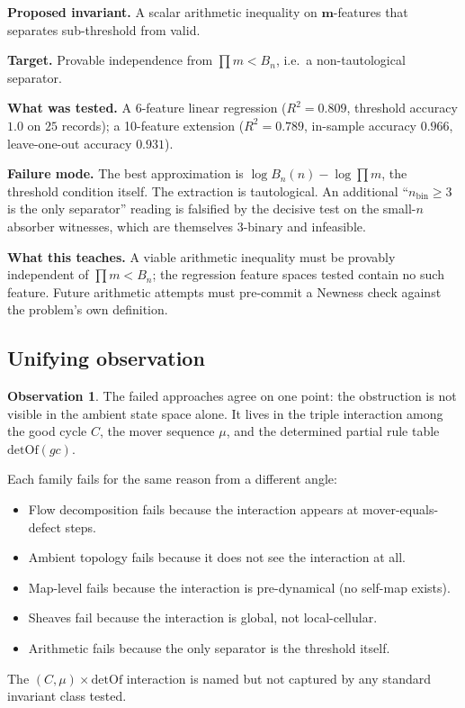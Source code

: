 \documentclass[11pt,a4paper]{article}
\theoremstyle{plain}
\theoremstyle{definition}
\newtheorem{observation}[theorem]{Observation}
\newcommand{\Bn}{B_n}
\newcommand{\detOf}{\mathrm{detOf}}
\begin{document}
\textbf{Proposed invariant.} A scalar arithmetic inequality on
$\mathbf{m}$-features that separates sub-threshold from valid.

\textbf{Target.} Provable independence from $\prod m < \Bn$, i.e.\ a
non-tautological separator.

\textbf{What was tested.} A 6-feature linear regression
($R^2 = 0.809$, threshold accuracy $1.0$ on $25$ records); a 10-feature
extension ($R^2 = 0.789$, in-sample accuracy $0.966$, leave-one-out
accuracy $0.931$).

\textbf{Failure mode.} The best approximation is
$\log \Bn(n) - \log \prod m$, the threshold condition itself.  The
extraction is tautological.  An additional ``$n_{\mathrm{bin}} \ge 3$
is the only separator'' reading is falsified by the decisive test
on the small-$n$ absorber witnesses, which are themselves $3$-binary
and infeasible.

\textbf{What this teaches.} A viable arithmetic inequality must be
provably independent of $\prod m < \Bn$; the regression feature spaces
tested contain no such feature.  Future arithmetic attempts must
pre-commit a Newness check against the problem's own definition.

\subsection{Unifying observation}\label{sec:landscape-unify}

\begin{observation}\label{obs:locus}
The failed approaches agree on one point: the obstruction is not
visible in the ambient state space alone.  It lives in the triple
interaction among the good cycle $C$, the mover sequence $\mu$, and
the determined partial rule table $\detOf(gc)$.
\end{observation}

Each family fails for the same reason from a different angle:

\begin{itemize}[leftmargin=*]
\item Flow decomposition fails because the interaction appears at
mover-equals-defect steps.
\item Ambient topology fails because it does not see the interaction
at all.
\item Map-level fails because the interaction is pre-dynamical (no
self-map exists).
\item Sheaves fail because the interaction is global, not
local-cellular.
\item Arithmetic fails because the only separator is the threshold
itself.
\end{itemize}
The $(C, \mu) \times \detOf$ interaction is named but not captured by
any standard invariant class tested.
\end{document}
